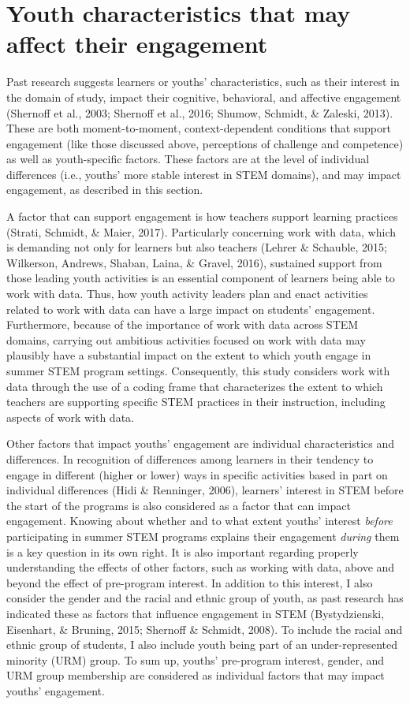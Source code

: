 \documentclass[]{book}
\theoremstyle{definition}
\theoremstyle{definition}
\theoremstyle{definition}
\theoremstyle{remark}
\begin{document}
\section{Youth characteristics that may affect their
engagement}\label{youth-characteristics-that-may-affect-their-engagement}

Past research suggests learners or youths' characteristics, such as
their interest in the domain of study, impact their cognitive,
behavioral, and affective engagement (Shernoff et al., 2003; Shernoff et
al., 2016; Shumow, Schmidt, \& Zaleski, 2013). These are both
moment-to-moment, context-dependent conditions that support engagement
(like those discussed above, perceptions of challenge and competence) as
well as youth-specific factors. These factors are at the level of
individual differences (i.e., youths' more stable interest in STEM
domains), and may impact engagement, as described in this section.

A factor that can support engagement is how teachers support learning
practices (Strati, Schmidt, \& Maier, 2017). Particularly concerning
work with data, which is demanding not only for learners but also
teachers (Lehrer \& Schauble, 2015; Wilkerson, Andrews, Shaban, Laina,
\& Gravel, 2016), sustained support from those leading youth activities
is an essential component of learners being able to work with data.
Thus, how youth activity leaders plan and enact activities related to
work with data can have a large impact on students' engagement.
Furthermore, because of the importance of work with data across STEM
domains, carrying out ambitious activities focused on work with data may
plausibly have a substantial impact on the extent to which youth engage
in summer STEM program settings. Consequently, this study considers work
with data through the use of a coding frame that characterizes the
extent to which teachers are supporting specific STEM practices in their
instruction, including aspects of work with data.

Other factors that impact youths' engagement are individual
characteristics and differences. In recognition of differences among
learners in their tendency to engage in different (higher or lower) ways
in specific activities based in part on individual differences (Hidi \&
Renninger, 2006), learners' interest in STEM before the start of the
programs is also considered as a factor that can impact engagement.
Knowing about whether and to what extent youths' interest \emph{before}
participating in summer STEM programs explains their engagement
\emph{during} them is a key question in its own right. It is also
important regarding properly understanding the effects of other factors,
such as working with data, above and beyond the effect of pre-program
interest. In addition to this interest, I also consider the gender and
the racial and ethnic group of youth, as past research has indicated
these as factors that influence engagement in STEM (Bystydzienski,
Eisenhart, \& Bruning, 2015; Shernoff \& Schmidt, 2008). To include the
racial and ethnic group of students, I also include youth being part of
an under-represented minority (URM) group. To sum up, youths'
pre-program interest, gender, and URM group membership are considered as
individual factors that may impact youths' engagement.
\end{document}
